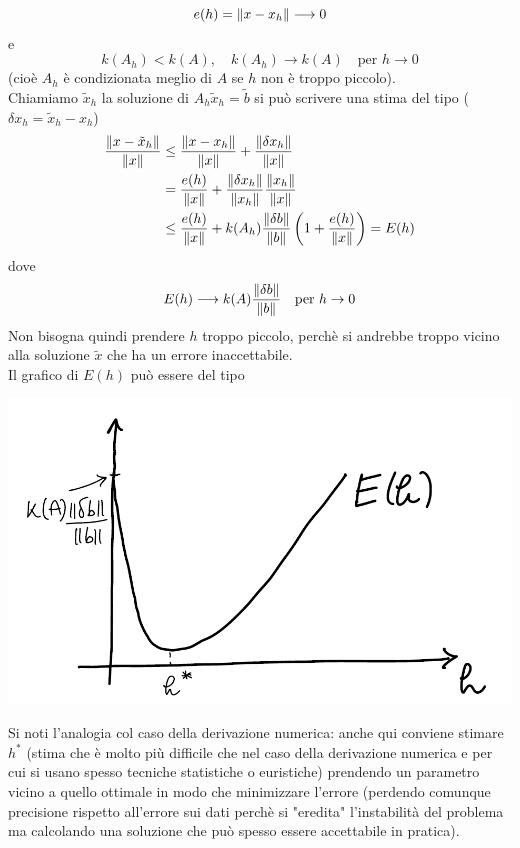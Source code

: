 \documentclass[12pt,a4paper]{article}
\DeclarePairedDelimiter{\norma}{\lVert}{\rVert}
\begin{document}
\[ e(h) = \norma{x - x_h} \longrightarrow 0\]
e
\[ k(A_h) < k(A), \quad k(A_h) \longrightarrow k(A) \quad \text{per } h \to 0\]
(cioè $A_h$ è condizionata meglio di $A$ se $h$ non è troppo piccolo).\\
Chiamiamo $\tilde{x}_h$ la soluzione di $A_h \tilde{x}_h = \tilde{b}$ si può scrivere una stima del tipo ($\delta x_h = \tilde{x}_h - x_h$)
\begin{align*}
    \frac{\norma{x - \tilde{x}_h}}{\norma{x}} & \le \frac{\norma{x - x_h}}{\norma{x}} + \frac{\norma{\delta x_h}}{\norma{x}} \\
    & = \frac{e(h)}{\norma{x}} + \frac{\norma{\delta x_h}}{\norma{x_h}} \frac{\norma{x_h}}{\norma{x}} \\
    &\le \frac{e(h)}{\norma{x}} + k(A_h)\frac{\norma{\delta b}}{\norma{b}} \left( 1 + \frac{e(h)}{\norma{x}} \right) = E(h)
\end{align*}
dove 
\[ E(h) \longrightarrow k(A)\frac{\norma{\delta b}}{\norma{b}} \quad \text{per } h \to 0\]
Non bisogna quindi prendere $h$ troppo piccolo, perchè si andrebbe troppo vicino alla soluzione $\tilde{x}$ che ha un errore inaccettabile. \\
Il grafico di $E(h)$ può essere del tipo
\begin{center}
    \includegraphics[scale=0.5]{lez20_pag35.png}    
\end{center}
Si noti l'analogia col caso della derivazione numerica: anche qui conviene stimare $h^*$ (stima che è molto più difficile che nel caso della derivazione numerica e per cui si usano spesso tecniche statistiche o euristiche) prendendo un parametro vicino a quello ottimale in modo che minimizzare l'errore (perdendo comunque precisione rispetto all'errore sui dati perchè si "eredita" l'instabilità del problema ma calcolando una soluzione che può spesso essere accettabile in pratica).
\end{document}
